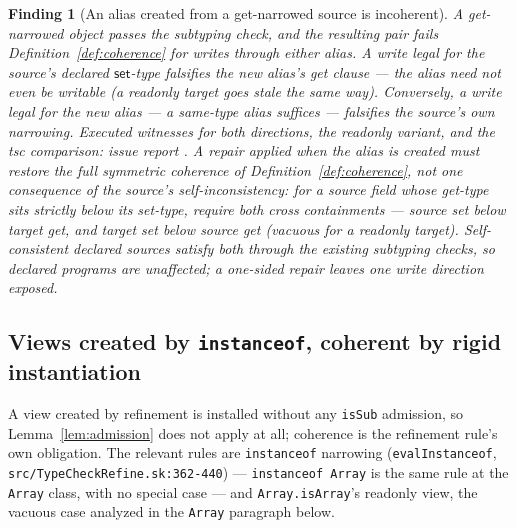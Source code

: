 \documentclass[11pt]{article}
\newtheorem{finding}[theorem]{Finding}
\begin{document}
\begin{finding}[An alias created from a get-narrowed source is incoherent]
\label{find:narrowed-alias}
A get-narrowed object passes the subtyping check, and the resulting pair
fails Definition~\ref{def:coherence} for writes through either alias. A
write legal for the source's declared $\mathsf{set}$-type falsifies the
new alias's get clause — the alias need not even be writable (a readonly
target goes stale the same way). Conversely, a write legal for the new
alias — a same-type alias suffices — falsifies the source's
own narrowing. Executed witnesses for both directions, the readonly
variant, and the tsc comparison: issue report
. A repair applied when the
alias is created
must restore the full symmetric coherence of
Definition~\ref{def:coherence}, not one consequence of the source's
self-inconsistency: for a source field whose get-type sits strictly
below its set-type, require \emph{both} cross containments — source
set below target get, and target set below source get (vacuous for a
readonly target). Self-consistent declared sources satisfy both through
the existing subtyping checks, so declared programs are unaffected; a
one-sided repair leaves one write direction exposed.
\end{finding}

\subsection{Views created by \texttt{instanceof}, coherent by
rigid instantiation}
\label{sec:created}

A view created by refinement is installed without any
\texttt{isSub} admission, so Lemma~\ref{lem:admission} does not apply
at all; coherence is the refinement rule's own obligation. The relevant
rules are \texttt{instanceof} narrowing
(\texttt{evalInstanceof}, \texttt{src/TypeCheckRefine.sk:362-440}) —
\texttt{instanceof Array} is the same rule at the \texttt{Array}
class, with no special case — and \texttt{Array.isArray}'s readonly
view, the vacuous case analyzed in the \texttt{Array} paragraph below.
\end{document}
